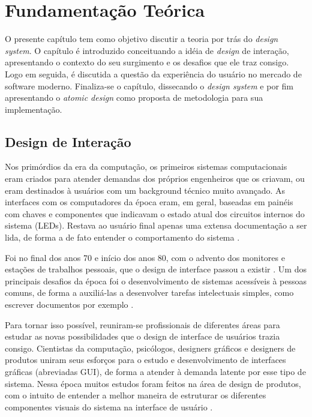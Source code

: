 
\chapter{Fundamentação Teórica}
\label{chap:fundamentacaoTeorica}

O presente capítulo tem como objetivo discutir a teoria por trás do \textit{design system}. O capítulo é introduzido conceituando a idéia de \textit{design} de interação, apresentando o contexto do seu surgimento e os desafios que ele traz consigo. Logo em seguida, é discutida a questão da experiência do usuário no mercado de software moderno. Finaliza-se o capítulo, dissecando o \textit{design system} e por fim apresentando o \textit{atomic design} como proposta de metodologia para sua implementação.

\section{Design de Interação}
\label{sec:designInteracao}

Nos primórdios da era da computação, os primeiros sistemas computacionais eram criados para atender demandas dos próprios engenheiros que os criavam, ou eram destinados à usuários com um background técnico muito avançado. As interfaces com os computadores da época eram, em geral, baseadas em painéis com chaves e componentes que indicavam o estado atual dos circuitos internos do sistema (LEDs). Restava ao usuário final apenas uma extensa documentação a ser lida, de forma a de fato entender o comportamento do sistema \cite{preece2005design}.

Foi no final dos anos 70 e início dos anos 80, com o advento dos monitores e estações de trabalhos pessoais, que o design de interface passou a existir \cite{grudin1990computer}. Um dos principais desafios da época foi o desenvolvimento de sistemas acessíveis à pessoas comuns, de forma a auxiliá-las a desenvolver tarefas intelectuais simples, como escrever documentos por exemplo \cite{preece2005design}.

Para tornar isso possível, reuniram-se profissionais de diferentes áreas para estudar as novas possibilidades que o design de interface de usuários trazia consigo. Cientistas da computação, psicólogos, designers gráficos e designers de produtos uniram seus esforços para o estudo e desenvolvimento de interfaces gráficas (abreviadas GUI), de forma a atender à demanda latente por esse tipo de sistema. Nessa época muitos estudos foram feitos na área de design de produtos, com o intuito de entender a melhor maneira de estruturar os diferentes componentes visuais do sistema na interface de usuário \cite{preece2005design}.


